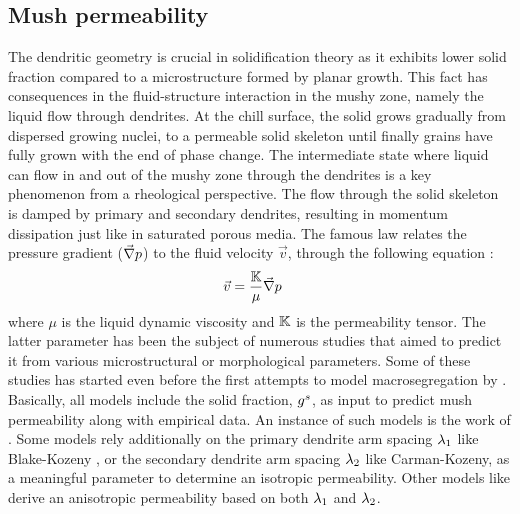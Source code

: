 \subsection{Mush permeability}
The dendritic geometry is crucial in solidification theory as it exhibits lower solid fraction compared to a microstructure formed by planar growth.
This fact has consequences in the fluid-structure interaction in the mushy zone, namely the liquid flow through dendrites. At the chill surface,
the solid  grows gradually from dispersed growing nuclei, to a permeable solid skeleton until finally grains have fully grown with the end of phase change.
The intermediate state where liquid can flow in and out of the mushy zone through the dendrites is a key phenomenon from a rheological perspective.
The flow through the solid skeleton is damped by primary and secondary dendrites, resulting in momentum dissipation just like in saturated porous media. 
The famous \citet{darcy_les_1856} law relates the pressure gradient ($\vec{\nabla} p$) to the fluid velocity $\vec{v}$, through the following equation \citep{rappaz_numerical_2003}:
\begin{align}
\label{eq:darcy}
& \vec{v} = \frac{\mathbb{K}}{\mu} \vec{\nabla} p
\end{align}
where $\mu$ is the liquid dynamic viscosity and $\mathbb{K}$ is the permeability tensor. The latter parameter has been the subject of numerous studies that aimed
to predict it from various microstructural or morphological parameters.
Some of these studies has started even before the first attempts to model macrosegregation by \citet{flemings_macrosegregation:_1967, flemings_macrosegregation:_1968-1,flemings_macrosegregation:_1968}. Basically, all models include the solid fraction, ${g^s}$, as input 
to predict mush permeability along with empirical data. An instance of such models is the work of \citet{xu_gravity-_1991}.
Some models rely additionally on the primary dendrite arm spacing ${\lambda}_{1}$ like Blake-Kozeny \citep{ramirez_evaluation_2003}, or the secondary 
dendrite arm spacing ${\lambda}_{2}$ like Carman-Kozeny, as a meaningful parameter to determine an isotropic permeability. 
Other models like \citet{poirier_permeability_1987,felicelli_simulation_1991} derive an anisotropic permeability based on both ${\lambda}_{1}$ and ${\lambda}_{2}$.

